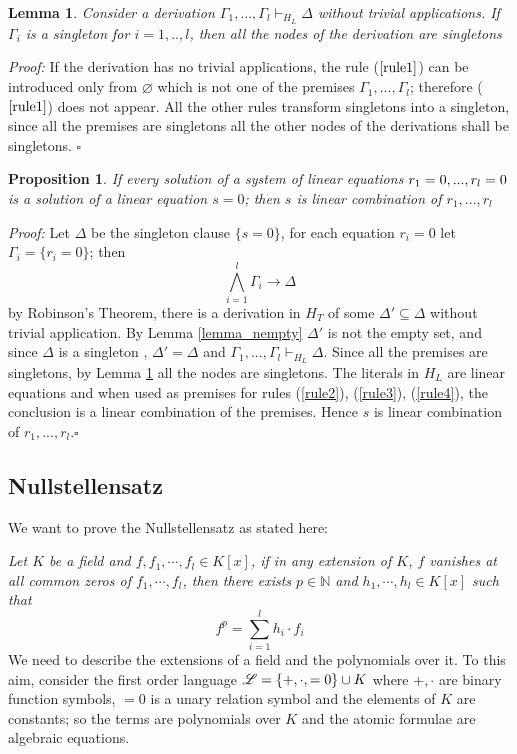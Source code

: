 \documentclass[a4paper,12pt,oneside]{book}
\newtheorem{proposition}[theorem]{Proposition}
\newtheorem{lemma}[theorem]{Lemma}
\newcommand*{\QED}{\hfill\ensuremath{\square}}
\let\emptyset\varnothing
\begin{document}
\begin{lemma}\label{lemma_onlysingletons}
Consider a derivation $\Gamma_1,...,\Gamma_l \vdash_{H_L} \Delta $ without trivial applications. 
If $\Gamma_i$ is a singleton for $i=1,..,l$, then all the nodes of the derivation are singletons
\end{lemma}
\textit{Proof:} If the derivation has no trivial applications, the rule ($\ref{rule1}$) can be introduced only from $\emptyset$ which is not one of the premises $\Gamma_1,...,\Gamma_l$; therefore ($\ref{rule1}$)  does not appear. All the other rules transform singletons into a singleton, since all the premises are singletons all the other nodes of the derivations shall be singletons. \QED

\begin{proposition} 
If every solution of a system of linear equations $r_1=0,...,r_l=\nobreak 0$  is a solution of a linear equation $s=0$; then $s$ is linear combination of $r_1,...,r_l$
\end{proposition}

\textit{Proof:} Let $\Delta$ be the singleton clause $\{s=0\}$, for each equation $r_i=0$  let $\Gamma_i=\{r_i=0\}$; then 
$$ \bigwedge_{i=1}^l \Gamma_i \rightarrow \Delta $$
by Robinson's Theorem, there is a derivation in $H_T$ of some $\Delta' \subseteq\Delta$ without trivial application. By Lemma \ref{lemma_nempty} $\Delta'$ is not the empty set,  and  since $\Delta$ is a singleton , $\Delta'=\Delta$ and $ \Gamma_1,...,\Gamma_l \vdash_{H_L} \Delta  $.
Since all the premises are singletons, by Lemma \ref{lemma_onlysingletons} all the nodes are singletons. The literals in $H_L$ are linear equations and when used as premises for rules (\ref{rule2}), (\ref{rule3}), (\ref{rule4}), the conclusion is a linear combination of the premises. 
Hence $s$ is linear combination of $r_1,...,r_l$.\QED


\subsection*{Nullstellensatz} \label{null}


We want to prove the Nullstellensatz as stated here:

\noindent\textit{Let $K$ be a field and $f,f_1,\cdots, f_l \in K[{x}]$, if in any extension of $K$, $f$ vanishes at all common zeros of $f_1,\cdots, f_l$, then there exists $p\in \mathbb{N}$ and $h_1,\cdots, h_l \in K[{x}]$ such that} 
$$
f^p = \sum_{i=1}^l h_i \cdot f_i
$$
We need to describe the extensions of a field and the polynomials over it. To this aim, consider the first order language $\mathscr{L}=\{+,\cdot,=\nobreak 0\}\cup\nobreak K$ where $+,\cdot$ are binary function symbols, $=0$ is a unary relation symbol and the elements of $K$ are constants; so the terms are polynomials over $K$ and the atomic formulae are algebraic equations.
\end{document}
